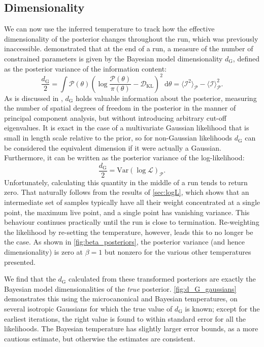 \documentclass[usenatbib]{mnras}
\newcommand{\Like}{\mathcal{L}}
\newcommand{\DKL}{\mathcal{D}_\mathrm{KL}}
\newcommand{\dG}{d_\mathrm{G}}
\begin{document}
\subsection{Dimensionality}\label{sec:dimensionality}
We can now use the inferred temperature to track how the effective dimensionality of the posterior changes throughout the run, which was previously inaccessible. \citet{Handley_2019} demonstrated that at the end of a run, a measure of the number of constrained parameters is given by the Bayesian model dimensionality $\dG$, defined as the posterior variance of the information content:
\begin{equation}\label{eq:d_G}
    \frac{\dG}{2} = \int \mathcal{P}(\theta) \left(\log \frac{\mathcal{P}(\theta)}{\pi(\theta)} - \DKL\right)^2 \: \mathrm{d}\theta
    = \langle \mathcal{I}^2 \rangle_\mathcal{P} - \langle \mathcal{I} \rangle^2_\mathcal{P}.
\end{equation}
As is discussed in \citet{Handley_2019}, $\dG$ holds valuable information about the posterior, measuring the number of spatial degrees of freedom in the posterior in the manner of principal component analysis, but without introducing arbitrary cut-off eigenvalues. It is exact in the case of a multivariate Gaussian likelihood that is small in length scale relative to the prior, so for non-Gaussian likelihoods $\dG$ can be considered the equivalent dimension if it were actually a Gaussian. Furthermore, it can be written as the posterior variance of the log-likelihood:
\begin{equation}
    \frac{\dG}{2} = \mathrm{Var}(\log\Like)_\mathcal{P}.
\end{equation}
Unfortunately, calculating this quantity in the middle of a run tends to return zero. That naturally follows from the results of \cref{sec:logL}, which shows that an intermediate set of samples typically have all their weight concentrated at a single point, the maximum live point, and a single point has vanishing variance. This behaviour continues practically until the run is close to termination. Re-weighting the likelihood by re-setting the temperature, however, leads this to no longer be the case. As shown in \cref{fig:beta_posteriors}, the posterior variance (and hence dimensionality) is zero at $\beta = 1$ but nonzero for the various other temperatures presented. 
\par
We find that the $\dG$ calculated from these transformed posteriors are exactly the Bayesian model dimensionalities of the \textit{true} posterior. \cref{fig:d_G_gaussians} demonstrates this using the microcanonical and Bayesian temperatures, on several isotropic Gaussians for which the true value of $\dG$ is known; except for the earliest iterations, the right value is found to within standard error for all the likelihoods. The Bayesian temperature has slightly larger error bounds, as a more cautious estimate, but otherwise the estimates are consistent. 
\end{document}
